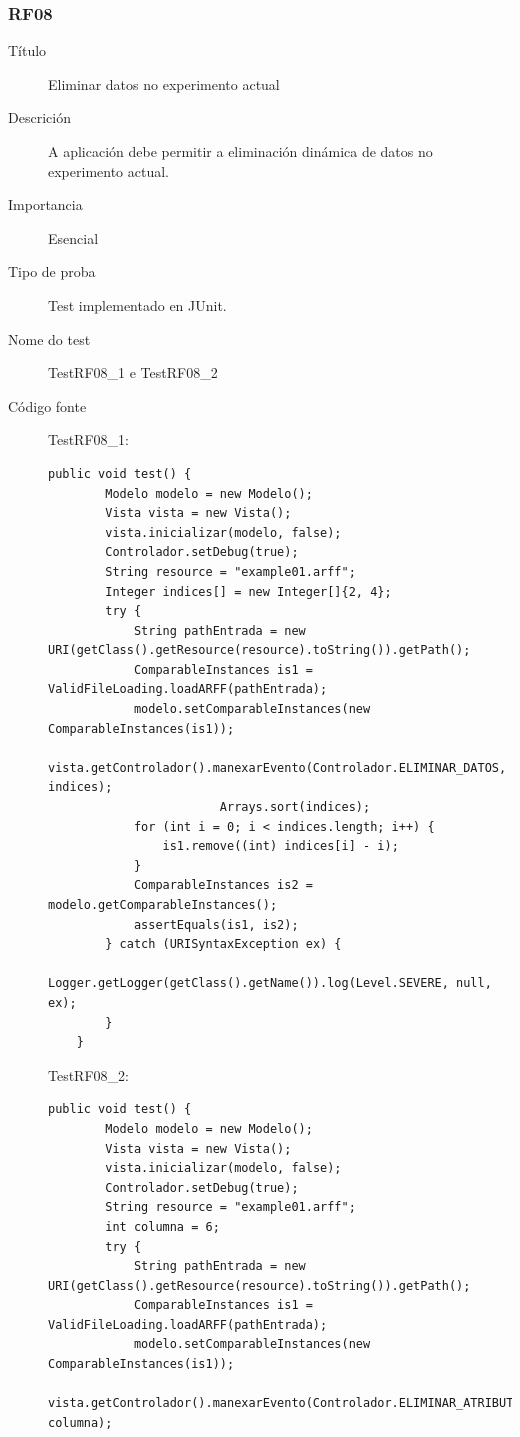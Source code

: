 \subsubsection*{RF08}
\begin{description}
\item[Título] \hfill
Eliminar datos no experimento actual
\item[Descrición] \hfill
A aplicación debe permitir a eliminación dinámica de datos no experimento actual.
\item[Importancia] \hfill
Esencial
\item[Tipo de proba] \hfill
Test implementado en JUnit.
\item[Nome do test] \hfill
TestRF08\_1 e TestRF08\_2
\item[Código fonte]
TestRF08\_1:
\begin{lstlisting}
public void test() {
        Modelo modelo = new Modelo();
        Vista vista = new Vista();
        vista.inicializar(modelo, false);
        Controlador.setDebug(true);
        String resource = "example01.arff";
        Integer indices[] = new Integer[]{2, 4};
        try {
            String pathEntrada = new URI(getClass().getResource(resource).toString()).getPath();
            ComparableInstances is1 = ValidFileLoading.loadARFF(pathEntrada);
            modelo.setComparableInstances(new ComparableInstances(is1));
            vista.getControlador().manexarEvento(Controlador.ELIMINAR_DATOS, indices);
						Arrays.sort(indices);
            for (int i = 0; i < indices.length; i++) {
                is1.remove((int) indices[i] - i);
            }
            ComparableInstances is2 = modelo.getComparableInstances();
            assertEquals(is1, is2);
        } catch (URISyntaxException ex) {
            Logger.getLogger(getClass().getName()).log(Level.SEVERE, null, ex);
        }
    }
\end{lstlisting}
TestRF08\_2:
\begin{lstlisting}
public void test() {
        Modelo modelo = new Modelo();
        Vista vista = new Vista();
        vista.inicializar(modelo, false);
        Controlador.setDebug(true);
        String resource = "example01.arff";
        int columna = 6;
        try {
            String pathEntrada = new URI(getClass().getResource(resource).toString()).getPath();
            ComparableInstances is1 = ValidFileLoading.loadARFF(pathEntrada);
            modelo.setComparableInstances(new ComparableInstances(is1));
            vista.getControlador().manexarEvento(Controlador.ELIMINAR_ATRIBUTO, columna);

\end{lstlisting}
\end{description}
